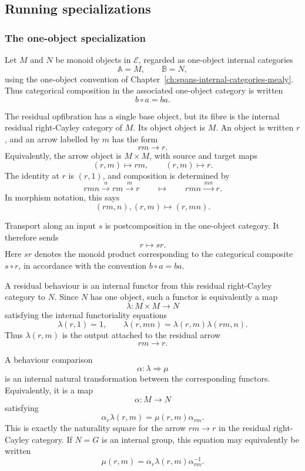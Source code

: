 \subsection{Running specializations}
\label{subsec:residual-behaviour-running-specializations}

\subsubsection{The one-object specialization}

Let \(M\) and \(N\) be monoid objects in \(\mathcal E\), regarded as one-object internal categories
\[
    \mathbb A=M,
    \qquad
    \mathbb B=N,
\]
using the one-object convention of Chapter~\ref{ch:spans-internal-categories-mealy}. Thus categorical composition in the associated one-object category is written
\[
    b\circ a=ba.
\]

The residual opfibration has a single base object, but its fibre is the internal residual right-Cayley category of \(M\). Its object object is \(M\). An object is written \(r\), and an arrow labelled by \(m\) has the form 
\[
    rm\longrightarrow r.
\]
Equivalently, the arrow object is \(M\times M\), with source and target maps
\[
    (r,m)\longmapsto rm,
    \qquad
    (r,m)\longmapsto r.
\]
The identity at \(r\) is \((r,1)\), and composition is determined by
\[
    rmn \xrightarrow{\,n\,} rm \xrightarrow{\,m\,} r
    \qquad\longmapsto\qquad
    rmn \xrightarrow{\,mn\,} r.
\]
In morphism notation, this says
\[
    (rm,n),(r,m)\longmapsto (r,mn).
\]

Transport along an input \(s\) is postcomposition in the one-object category. It therefore sends
\[
    r\longmapsto sr.
\]
Here \(sr\) denotes the monoid product corresponding to the categorical composite \(s\circ r\), in accordance with the convention \(b\circ a=ba\).

A residual behaviour is an internal functor from this residual right-Cayley category to \(N\). Since \(N\) has one object, such a functor is equivalently a map
\[
    \lambda:M\times M\to N
\]
satisfying the internal functoriality equations
\[
    \lambda(r,1)=1,
    \qquad
    \lambda(r,mn)=\lambda(r,m)\lambda(rm,n).
\]
Thus \(\lambda(r,m)\) is the output attached to the residual arrow
\[
    rm\longrightarrow r.
\]

A behaviour comparison
\[
    \alpha:\lambda\Rightarrow\mu
\]
is an internal natural transformation between the corresponding functors. Equivalently, it is a map
\[
    \alpha:M\to N
\]
satisfying
\[
    \alpha_r\lambda(r,m)=\mu(r,m)\alpha_{rm}.
\]
This is exactly the naturality square for the arrow \(rm\to r\) in the residual right-Cayley category. If \(N=G\) is an internal group, this equation may equivalently be written
\[
    \mu(r,m)=\alpha_r\lambda(r,m)\alpha_{rm}^{-1}.
\]

